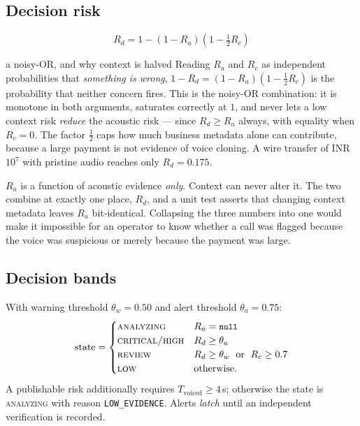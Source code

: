 \documentclass[11pt,a4paper]{article}
\newcommand{\code}[1]{\texttt{\small #1}}
\begin{document}
\subsection{Decision risk}

\begin{equation}
\boxed{\;R_d = 1 - (1-R_a)\left(1 - \tfrac12 R_c\right)\;}
\end{equation}

\begin{whybox}{a noisy-OR, and why context is halved}
Reading $R_a$ and $R_c$ as independent probabilities that \emph{something is wrong},
$1-R_d = (1-R_a)(1-\tfrac12 R_c)$ is the probability that neither concern fires. This is
the noisy-OR combination: it is monotone in both arguments, saturates correctly at $1$,
and never lets a low context risk \emph{reduce} the acoustic risk --- since
$R_d \ge R_a$ always, with equality when $R_c = 0$. The factor $\tfrac12$ caps how much
business metadata alone can contribute, because a large payment is not evidence of voice
cloning. A wire transfer of INR $10^7$ with pristine audio reaches only
$R_d = 0.175$.
\end{whybox}

\begin{tcolorbox}[colback=strivegrey,colframe=strivenavy,title=\textbf{The separation invariant}]
$R_a$ is a function of acoustic evidence \emph{only}. Context can never alter it. The
two combine at exactly one place, $R_d$, and a unit test asserts that changing context
metadata leaves $R_a$ bit-identical. Collapsing the three numbers into one would make it
impossible for an operator to know whether a call was flagged because the voice was
suspicious or merely because the payment was large.
\end{tcolorbox}

\subsection{Decision bands}

With warning threshold $\theta_w = 0.50$ and alert threshold $\theta_a = 0.75$:
\begin{equation}
\text{state} =
\begin{cases}
\textsc{analyzing} & R_a = \code{null}\\
\textsc{critical/high} & R_d \ge \theta_a\\
\textsc{review} & R_d \ge \theta_w \;\text{ or }\; R_c \ge 0.7\\
\textsc{low} & \text{otherwise.}
\end{cases}
\end{equation}
A publishable risk additionally requires $T_{\text{voiced}} \ge 4$\,s; otherwise the
state is \textsc{analyzing} with reason \code{LOW\_EVIDENCE}. Alerts \emph{latch} until
an independent verification is recorded.
\end{document}

